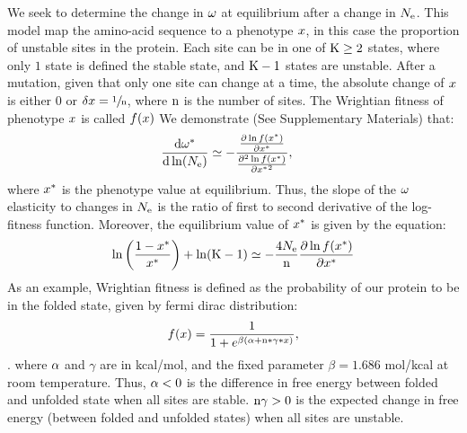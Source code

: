 \documentclass{article}
\begin{document}
We seek to determine the change in $\omega$ at equilibrium after a change in $N_{\mathrm{e}}$.
This model map the amino-acid sequence to a phenotype $x$, in this case the proportion of unstable sites in the protein. Each site can be in one of $\text{K} \geq 2$ states, where only $1$ state is defined the stable state, and $\text{K} - 1$ states are unstable. After a mutation, given that only one site can change at a time, the absolute change of $x$ is either $0$ or $\delta x=\sfrac{1}{\text{n}}$, where $\text{n}$ is the number of sites. The Wrightian fitness of phenotype $x$ is called $f(x)$
We demonstrate (See Supplementary Materials) that: 
\begin{align}
\frac{ \mathrm{d} \omega^{*}}{\mathrm{d} \ln (N_{\mathrm{e}})} & \simeq - \frac{\frac{ \partial \ln f(x^{*}) }{\partial {x^{*}}}}{\frac{ \partial^2 \ln f(x^{*}) }{\partial {x^{*}}^2}},
\end{align}
where $x^{*}$ is the phenotype value at equilibrium.
Thus, the slope of the $\omega$ elasticity to changes in $N_{\mathrm{e}}$ is the ratio of first to second derivative of the log-fitness function. Moreover, the equilibrium value of $x^{*}$ is given by the equation:
\begin{align}
\ln \left( \frac{1 - x^{*}}{x^{*}} \right) + \ln (\text{K}-1) \simeq - \frac{4N_{\mathrm{e}}}{\text{n}} \frac{ \partial \ln f(x^{*}) }{\partial {x^{*}}}
\end{align}
As an example, Wrightian fitness is defined as the probability of our protein to be in the folded state, given by fermi dirac distribution: 
\begin{equation}
f(x) = \dfrac{1}{1 + e^{\beta (\alpha + \text{n} * \gamma * x)}}, 
\end{equation} .
where $\alpha$ and $\gamma$ are in kcal/mol, and the fixed parameter $\beta=1.686$ mol/kcal at room temperature. Thus, $\alpha < 0$ is the difference in free energy between folded and unfolded state when all sites are stable. $\text{n} \gamma > 0$ is the expected change in free energy (between folded and unfolded states) when all sites are unstable.
\end{document}

